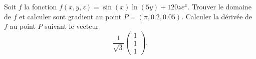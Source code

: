\begin{exercice}\label{exoGeomAnal-0021}

Soit $f$ la fonction $f(x,y,z) = \sin(x)\ln(5y)+120ze^x$. Trouver le domaine de $f$ et calculer sont gradient au point $P=(\pi, 0.2, 0.05)$.  Calculer la dérivée de $f$ au point $P$ suivant le vecteur 
\begin{equation}
 \frac{1}{\sqrt{3}} \begin{pmatrix}
   1\\
   1\\
   1
 \end{pmatrix}.
\end{equation}



\end{exercice}
